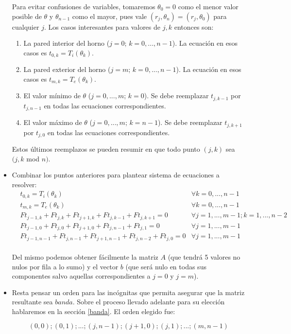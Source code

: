 \begin{itemize}
    Para evitar confusiones de variables, tomaremos $\theta_0 = 0$ como el menor valor posible de $\theta$ y $\theta_{n-1}$ como el mayor, pues vale $(r_j, \theta_n) = (r_j, \theta_0)$ para cualquier $j$. Los casos interesantes para valores de $j, k$ entonces son:
    \begin{enumerate}
     \item La pared interior del horno ($j = 0$; $k = 0, ..., n-1$). La ecuación en esos casos es $t_{0, k} = T_i(\theta_k)$.
     \item La pared exterior del horno ($j = m$; $k = 0, ..., n-1$). La ecuación en esos casos es $t_{m, k} = T_e(\theta_k)$.
     \item El valor mínimo de $\theta$ ($j = 0, ..., m$; $k = 0$). Se debe reemplazar $t_{j, k-1}$ por $t_{j, n-1}$ en todas las ecuaciones correspondientes.
     \item El valor máximo de $\theta$ ($j = 0, ..., m$; $k = n-1$). Se debe reemplazar $t_{j, k+1}$ por $t_{j, 0}$ en todas las ecuaciones correspondientes.
    \end{enumerate}
    Estos últimos reemplazos se pueden resumir en que todo punto $(j, k)$ sea $(j, k$ mod $n)$.
 \item
    Combinar los puntos anteriores para plantear sistema de ecuaciones a resolver:
    \begin{align*}
    &t_{0, k} = T_i(\theta_k)                                           &\forall k = 0, ..., n-1  \\
    &t_{m, k} = T_e(\theta_k)                                           &\forall k = 0, ..., n-1  \\
    &Ft_{j-1,k} + Ft_{j,k} + Ft_{j+1,k} + Ft_{j,k-1} + Ft_{j,k+1} = 0  &\forall j=1, ..., m-1; k = 1, ... , n-2 \\
    &Ft_{j-1,0} + Ft_{j,0} + Ft_{j+1,0} + Ft_{j,n-1} + Ft_{j,1} = 0    &\forall j=1, ..., m-1 \\
    &Ft_{j-1,n-1} + Ft_{j,n-1} + Ft_{j+1,n-1} + Ft_{j,n-2} + Ft_{j,0} = 0    &\forall j=1, ..., m-1 \\
    \end{align*}

    Del mismo podemos obtener fácilmente la matriz $A$ (que tendrá 5 valores no nulos por fila a lo sumo) y el vector $b$ (que será nulo en todas sus componentes salvo aquellas correspondientes a $j=0$ y $j=m$).
  \item
    Resta pensar un orden para las incógnitas que permita asegurar que la matriz resultante sea $banda$. Sobre el proceso llevado adelante para su elección hablaremos en la sección \ref{banda}. El orden elegido fue:
    
    $$ (0,0); (0,1); ... ; (j,n-1); (j+1,0); (j,1); ... ; (m, n-1)$$
\end{itemize}
